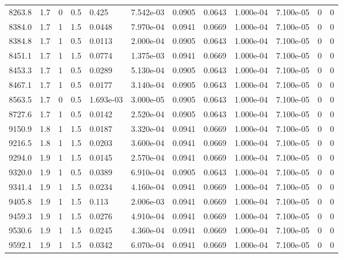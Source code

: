 \documentclass[preview]{standalone}
\begin{document}
{{{\begin{tabular}{L{1.2cm}C{1.2cm} C{0.3cm}C{0.5cm} C{1.4cm}C{1.4cm} C{1.4cm}C{1.4cm} C{1.6cm}C{1.6cm} C{1.6cm}C{1.6cm}}
  8263.8  &   1.7  & 0     & 0.5 &  0.425  & 7.542e-03  &  0.0905&   0.0643& 1.000e-04 & 7.100e-05   &  0 & 0  \\ 
  8384.0  &   1.7  & 1     & 1.5 &  0.0448  & 7.970e-04  &  0.0941&   0.0669& 1.000e-04 & 7.100e-05   &  0 & 0  \\ 
  8384.8  &   1.7  & 1     & 0.5 &  0.0113  & 2.000e-04  &  0.0905&   0.0643& 1.000e-04 & 7.100e-05   &  0 & 0  \\ 
  8451.1  &   1.7  & 1     & 1.5 &  0.0774  & 1.375e-03  &  0.0941&   0.0669& 1.000e-04 & 7.100e-05   &  0 & 0  \\ 
  8453.3  &   1.7  & 1     & 0.5 &  0.0289  & 5.130e-04  &  0.0905&   0.0643& 1.000e-04 & 7.100e-05   &  0 & 0  \\ 
  8467.1  &   1.7  & 1     & 0.5 &  0.0177  & 3.140e-04  &  0.0905&   0.0643& 1.000e-04 & 7.100e-05   &  0 & 0  \\ 
  8563.5  &   1.7  & 0     & 0.5 &  1.693e-03  & 3.000e-05  &  0.0905&   0.0643& 1.000e-04 & 7.100e-05   &  0 & 0  \\ 
  8727.6  &   1.7  & 1     & 0.5 &  0.0142  & 2.520e-04  &  0.0905&   0.0643& 1.000e-04 & 7.100e-05   &  0 & 0  \\ 
  9150.9  &   1.8  & 1     & 1.5 &  0.0187  & 3.320e-04  &  0.0941&   0.0669& 1.000e-04 & 7.100e-05   &  0 & 0  \\ 
  9216.5  &   1.8  & 1     & 1.5 &  0.0203  & 3.600e-04  &  0.0941&   0.0669& 1.000e-04 & 7.100e-05   &  0 & 0  \\ 
  9294.0  &   1.9  & 1     & 1.5 &  0.0145  & 2.570e-04  &  0.0941&   0.0669& 1.000e-04 & 7.100e-05   &  0 & 0  \\ 
  9320.0  &   1.9  & 1     & 0.5 &  0.0389  & 6.910e-04  &  0.0905&   0.0643& 1.000e-04 & 7.100e-05   &  0 & 0  \\ 
  9341.4  &   1.9  & 1     & 1.5 &  0.0234  & 4.160e-04  &  0.0941&   0.0669& 1.000e-04 & 7.100e-05   &  0 & 0  \\ 
  9405.8  &   1.9  & 1     & 1.5 &  0.113  & 2.006e-03  &  0.0941&   0.0669& 1.000e-04 & 7.100e-05   &  0 & 0  \\ 
  9459.3  &   1.9  & 1     & 1.5 &  0.0276  & 4.910e-04  &  0.0941&   0.0669& 1.000e-04 & 7.100e-05   &  0 & 0  \\ 
  9530.6  &   1.9  & 1     & 1.5 &  0.0245  & 4.360e-04  &  0.0941&   0.0669& 1.000e-04 & 7.100e-05   &  0 & 0  \\ 
  9592.1  &   1.9  & 1     & 1.5 &  0.0342  & 6.070e-04  &  0.0941&   0.0669& 1.000e-04 & 7.100e-05   &  0 & 0  \\ 

\end{tabular}}}}
\end{document}
